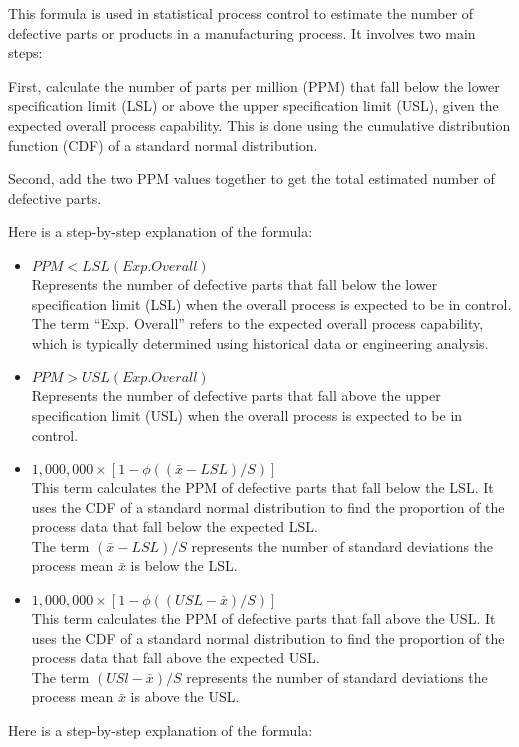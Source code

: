 \documentclass[11pt]{article}
\begin{document}
This formula is used in statistical process control to estimate the number
of defective parts or products in a manufacturing process. It involves two main steps:

First, calculate the number of parts per million (PPM) that fall
below the lower specification limit (LSL) or above the upper
specification limit (USL), given the expected overall process
capability. This is done using the cumulative distribution function (CDF) of a standard normal distribution.

Second, add the two PPM values together to get the total estimated number of defective parts.

Here is a step-by-step explanation of the formula:

\begin{itemize}
  \item \(PPM < LSL(Exp. Overall)\) 
  \\ Represents the number of defective parts that fall below the lower specification limit (LSL) when the
  overall process is expected to be in control. 
  \\ The term ``Exp. Overall'' refers to the expected overall process capability, which is typically
  determined using historical data or engineering analysis.

  \item \(PPM > USL(Exp. Overall)\) 
  \\ Represents the number of defective parts that fall above the
  upper specification limit (USL) when the overall process is expected to be in control.

  \item \( 1,000,000 \times [1 - \phi ( (\bar x - LSL)/S) ]\)
  \\ This term calculates the PPM of defective parts that fall below the LSL. It uses the CDF of a standard normal distribution to find the proportion of the process data that fall below the expected LSL.
  \\ The term \( (\bar x - LSL)/S \) represents the number of standard deviations the process mean \(\bar x\) is below the LSL.
  
  \item \( 1,000,000 \times [1 - \phi ( (USL - \bar x )/S) ]\)
  \\ This term calculates the PPM of defective parts that fall above the USL. It uses the CDF of a standard normal distribution to find the proportion of the process data that fall above the expected USL.
  \\ The term \( (USl - \bar x)/S\) represents the number of standard deviations the process mean \(\bar x\) is above the USL. 

\end{itemize}
Here is a step-by-step explanation of the formula:
\end{document}
